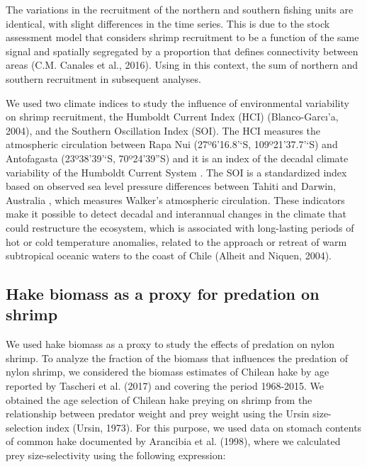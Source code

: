 \documentclass[12pt]{article}
\begin{document}
The variations in the recruitment of the northern and southern fishing
units are identical, with slight differences in the time series. This is
due to the stock assessment model that considers shrimp recruitment to
be a function of the same signal and spatially segregated by a
proportion that defines connectivity between areas (C.M. Canales et al.,
2016). Using in this context, the sum of northern and southern
recruitment in subsequent analyses.

We used two climate indices to study the influence of environmental
variability on shrimp recruitment, the Humboldt Current Index (HCI)
(Blanco-Garcı'a, 2004), and the Southern Oscillation Index (SOI). The
HCI measures the atmospheric circulation between Rapa Nui (27º6'16.8'`S,
109º21'37.7'`S) and Antofagasta (23º38'39'`S, 70º24'39''S) and it is an
index of the decadal climate variability of the Humboldt Current System
\href{http://www.bluewater.cl/HCI/hci.html}{}. The SOI is a standardized
index based on observed sea level pressure differences between Tahiti
and Darwin, Australia
\href{https://www.ncdc.noaa.gov/teleconnections/enso/indicators/soi/}{},
which measures Walker's atmospheric circulation. These indicators make
it possible to detect decadal and interannual changes in the climate
that could restructure the ecosystem, which is associated with
long-lasting periods of hot or cold temperature anomalies, related to
the approach or retreat of warm subtropical oceanic waters to the coast
of Chile (Alheit and Niquen, 2004).

\hypertarget{hake-biomass-as-a-proxy-for-predation-on-shrimp}{%
\subsection{Hake biomass as a proxy for predation on
shrimp}\label{hake-biomass-as-a-proxy-for-predation-on-shrimp}}

We used hake biomass as a proxy to study the effects of predation on
nylon shrimp. To analyze the fraction of the biomass that influences the
predation of nylon shrimp, we considered the biomass estimates of
Chilean hake by age reported by Tascheri et al. (2017) and covering the
period 1968-2015. We obtained the age selection of Chilean hake preying
on shrimp from the relationship between predator weight and prey weight
using the Ursin size-selection index (Ursin, 1973). For this purpose, we
used data on stomach contents of common hake documented by Arancibia et
al. (1998), where we calculated prey size-selectivity using the
following expression:
\end{document}
